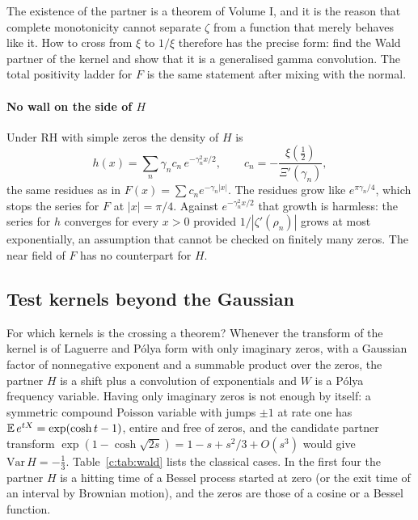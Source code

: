The existence of the partner is a theorem of Volume I, and it is the reason that complete monotonicity cannot separate $\zeta$ from a function that merely behaves like it. How to cross from $\xi$ to $1/\xi$ therefore has the precise form: find the Wald partner of the kernel and show that it is a generalised gamma convolution. The total positivity ladder for $F$ is the same statement after mixing with the normal.

\paragraph{No wall on the side of $H$} Under RH with simple zeros the density of $H$ is
\[
h(x)=\sum_n\gamma_nc_n\,e^{-\gamma_n^2x/2},\qquad c_n=-\frac{\xi(\frac12)}{\Xi'(\gamma_n)},
\]
the same residues as in $F(x)=\sum c_ne^{-\gamma_n|x|}$. The residues grow like $e^{\pi\gamma_n/4}$, which stops the series for $F$ at $|x|=\pi/4$. Against $e^{-\gamma_n^2x/2}$ that growth is harmless: the series for $h$ converges for every $x>0$ provided $1/|\zeta'(\rho_n)|$ grows at most exponentially, an assumption that cannot be checked on finitely many zeros. The near field of $F$ has no counterpart for $H$.

\subsection{Test kernels beyond the Gaussian}

For which kernels is the crossing a theorem? Whenever the transform of the kernel is of Laguerre and P\'olya form with only imaginary zeros, with a Gaussian factor of nonnegative exponent and a summable product over the zeros, the partner $H$ is a shift plus a convolution of exponentials and $W$ is a P\'olya frequency variable. Having only imaginary zeros is not enough by itself: a symmetric compound Poisson variable with jumps $\pm1$ at rate one has $\mathbb{E}\,e^{tX}=\exp(\cosh t-1)$, entire and free of zeros, and the candidate partner transform $\exp(1-\cosh\sqrt{2s})=1-s+s^2/3+O(s^3)$ would give $\mathrm{Var}\,H=-\frac13$. Table~\ref{c:tab:wald} lists the classical cases. In the first four the partner $H$ is a hitting time of a Bessel process started at zero (or the exit time of an interval by Brownian motion), and the zeros are those of a cosine or a Bessel function.

